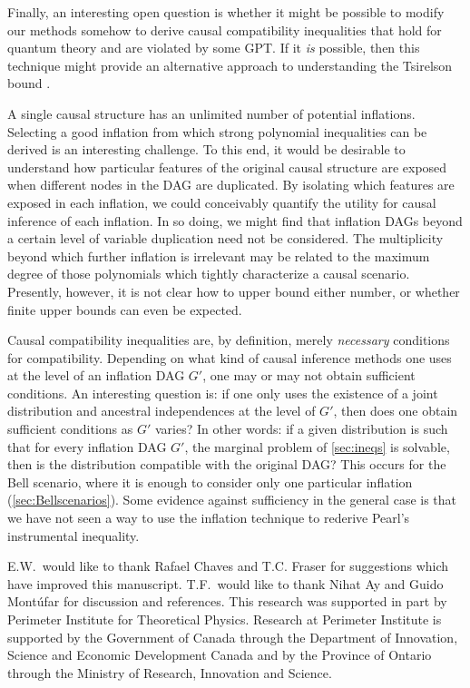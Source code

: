 \documentclass[aps,english,10pt,superscriptaddress,onecolumn,twoside,longbibliography,pra,floatfix,fleqn,nofootinbib]{revtex4-1}%
\theoremstyle{definition}
\begin{document}
Finally, an interesting open question is whether it might be possible to modify our methods somehow to derive causal compatibility inequalities that hold for quantum theory and are violated by some GPT.  If it {\em is} possible, then 
this technique might provide an alternative approach to understanding the Tsirelson bound \cite{Brunner2013Bell}.

A single causal structure has an unlimited number of potential inflations. Selecting a good inflation from which strong polynomial inequalities can be derived is an interesting challenge. To this end, it would be desirable to understand how particular features of the original causal structure are exposed when different nodes in the DAG are duplicated. By isolating which features are exposed in each inflation, we could conceivably quantify the utility for causal inference of each inflation. In so doing, we might find that inflation DAGs beyond a certain level of variable duplication need not be considered. The multiplicity beyond which further inflation is irrelevant may be related to the maximum degree of those polynomials which tightly characterize a causal scenario. Presently, however, it is not clear how to upper bound either number, or whether finite upper bounds can even be expected.


Causal compatibility inequalities are, by definition, merely {\em necessary} conditions for compatibility. Depending on what kind of causal inference methods one uses at the level of an inflation DAG $G'$, one may or may not obtain sufficient conditions. An interesting question is: if one only uses the existence of a joint distribution and ancestral independences at the level of $G'$, then does one obtain sufficient conditions as $G'$ varies? In other words: if a given distribution is such that for every inflation DAG $G'$, the marginal problem of \cref{sec:ineqs} is solvable, then is the distribution compatible with the original DAG? This occurs for the Bell scenario, where it is enough to consider only one particular inflation (\cref{sec:Bellscenarios}). Some evidence against sufficiency in the general case is that we have not seen a way to use the inflation technique to rederive Pearl's instrumental inequality.


\begin{acknowledgments}
E.W.~would like to thank Rafael Chaves and T.C. Fraser for suggestions which have improved this manuscript. T.F.~would like to thank Nihat Ay and Guido Mont\'ufar for discussion and references. This research was supported in part by Perimeter Institute for Theoretical Physics. Research at Perimeter Institute is supported by the Government of Canada through the Department of Innovation, Science and Economic Development Canada and by the Province of Ontario through the Ministry of Research, Innovation and Science.
\end{acknowledgments}
\end{document}
